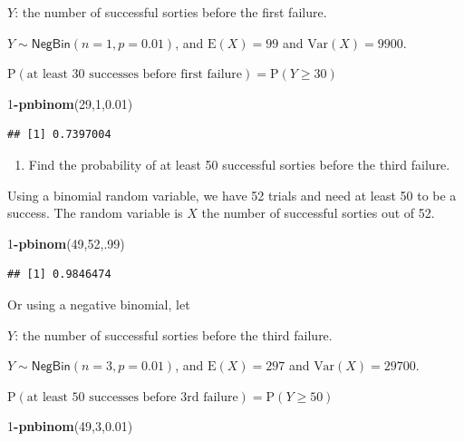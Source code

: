 \documentclass[
]{book}
\newenvironment{Shaded}{\begin{snugshade}}{\end{snugshade}}
\newcommand{\DecValTok}[1]{\textcolor[rgb]{0.00,0.00,0.81}{#1}}
\newcommand{\FloatTok}[1]{\textcolor[rgb]{0.00,0.00,0.81}{#1}}
\newcommand{\KeywordTok}[1]{\textcolor[rgb]{0.13,0.29,0.53}{\textbf{#1}}}
\newcommand{\NormalTok}[1]{#1}
\newcommand{\OperatorTok}[1]{\textcolor[rgb]{0.81,0.36,0.00}{\textbf{#1}}}
\providecommand{\tightlist}{%
  \setlength{\itemsep}{0pt}\setlength{\parskip}{0pt}}
\begin{document}
\(Y\): the number of successful sorties before the first failure.

\(Y\sim \textsf{NegBin}(n=1,p=0.01)\), and \(\mbox{E}(X)=99\) and \(\mbox{Var}(X)=9900\).

\(\mbox{P}(\mbox{at least 30 successes before first failure})=\mbox{P}(Y\geq 30)\)

\begin{Shaded}
\begin{Highlighting}[]
\DecValTok{1}\OperatorTok{-}\KeywordTok{pnbinom}\NormalTok{(}\DecValTok{29}\NormalTok{,}\DecValTok{1}\NormalTok{,}\FloatTok{0.01}\NormalTok{)}
\end{Highlighting}
\end{Shaded}

\begin{verbatim}
## [1] 0.7397004
\end{verbatim}

\begin{enumerate}
\def\labelenumi{\alph{enumi}.}
\setcounter{enumi}{3}
\tightlist
\item
  Find the probability of at least 50 successful sorties before the third failure.
\end{enumerate}

Using a binomial random variable, we have 52 trials and need at least 50 to be a success. The random variable is \(X\) the number of successful sorties out of 52.

\begin{Shaded}
\begin{Highlighting}[]
\DecValTok{1}\OperatorTok{-}\KeywordTok{pbinom}\NormalTok{(}\DecValTok{49}\NormalTok{,}\DecValTok{52}\NormalTok{,.}\DecValTok{99}\NormalTok{)}
\end{Highlighting}
\end{Shaded}

\begin{verbatim}
## [1] 0.9846474
\end{verbatim}

Or using a negative binomial, let

\(Y\): the number of successful sorties before the third failure.

\(Y\sim \textsf{NegBin}(n=3,p=0.01)\), and \(\mbox{E}(X)=297\) and \(\mbox{Var}(X)=29700\).

\(\mbox{P}(\mbox{at least 50 successes before 3rd failure})=\mbox{P}(Y\geq 50)\)

\begin{Shaded}
\begin{Highlighting}[]
\DecValTok{1}\OperatorTok{-}\KeywordTok{pnbinom}\NormalTok{(}\DecValTok{49}\NormalTok{,}\DecValTok{3}\NormalTok{,}\FloatTok{0.01}\NormalTok{)}
\end{Highlighting}
\end{Shaded}
\end{document}
